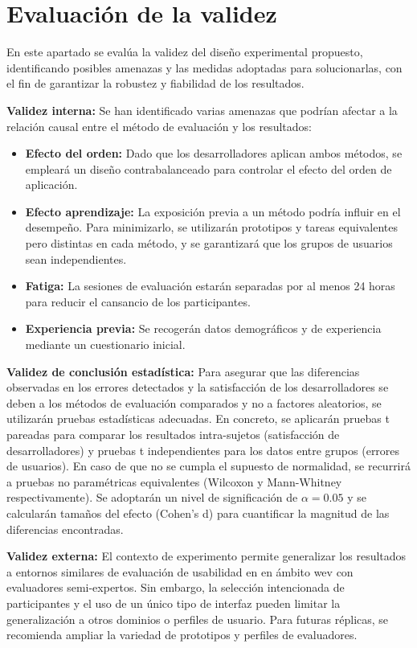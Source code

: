 \documentclass[a4paper,12pt]{report}
\begin{document}
\section{Evaluación de la validez}
En este apartado se evalúa la validez del diseño experimental propuesto, identificando posibles amenazas y las 
medidas adoptadas para solucionarlas, con el fin de garantizar la robustez y fiabilidad de los resultados.



\textbf{Validez interna:} Se han identificado varias amenazas que podrían afectar a la relación causal entre el método 
de evaluación y los resultados: 
\begin{itemize}
    \item \textbf{Efecto del orden:} Dado que los desarrolladores aplican ambos métodos, se empleará un diseño contrabalanceado para controlar el efecto del orden de aplicación.
    \item \textbf{Efecto aprendizaje:} La exposición previa a un método podría influir en el desempeño. Para minimizarlo, se utilizarán prototipos y tareas equivalentes pero distintas en cada método, y se garantizará que los grupos de usuarios sean independientes.
    \item \textbf{Fatiga:} La sesiones de evaluación estarán separadas por al menos 24 horas para reducir el cansancio de los participantes. 
    \item \textbf{Experiencia previa:} Se recogerán datos demográficos y de experiencia mediante un cuestionario inicial.
\end{itemize}

\textbf{Validez de conclusión estadística:} Para asegurar que las diferencias observadas en los errores detectados y la 
satisfacción de los desarrolladores se deben a los métodos de evaluación comparados y no a factores aleatorios, 
se utilizarán pruebas estadísticas adecuadas. En concreto, se aplicarán pruebas t pareadas para comparar los resultados intra-sujetos (satisfacción de 
desarrolladores) y pruebas t independientes para los datos entre grupos (errores de usuarios). En caso de que no se cumpla el 
supuesto de normalidad, se recurrirá a pruebas no paramétricas equivalentes (Wilcoxon y Mann-Whitney respectivamente).
Se adoptarán un nivel de significación de $\alpha=0.05$ y se calcularán tamaños del efecto (Cohen’s d) para cuantificar la magnitud de las diferencias encontradas.

\textbf{Validez externa:} El contexto de experimento permite generalizar los resultados a entornos similares de evaluación de usabilidad en en ámbito wev con evaluadores semi-expertos. Sin embargo, la selección 
intencionada de participantes y el uso de un único tipo de interfaz pueden limitar la generalización a otros dominios o perfiles de usuario. Para futuras réplicas, se recomienda ampliar la variedad de prototipos y perfiles de evaluadores.
\end{document}
